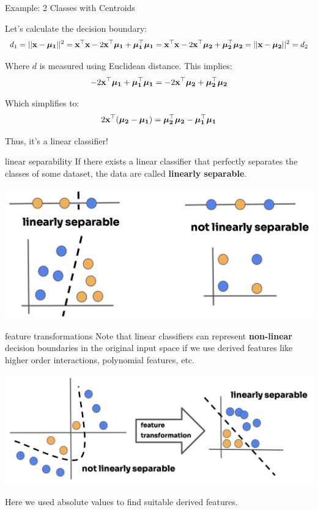 \documentclass[11pt,compress,t,notes=noshow, xcolor=table]{beamer}
\begin{document}
\begin{vbframe}{Example: 2 Classes with Centroids}

Let's calculate the decision boundary:
$$
d_1 = ||\xv - \muk[1]||^2 = \xv^\top \xv - 2 \xv^\top \muk[1] + \muk[1]^\top \muk[1]
= \xv^\top \xv - 2 \xv^\top \muk[2] + \muk[2]^\top \muk[2] = ||\xv - \muk[2]||^2 = d_2
$$

Where $d$ is measured using Euclidean distance. This implies:
$$
-2 \xv^\top \muk[1] + \muk[1]^\top \muk[1]
= -2 \xv^\top \muk[2] + \muk[2]^\top \muk[2]
$$

Which simplifies to:
$$
2 \xv^\top (\muk[2] - \muk[1]) =\muk[2]^\top \muk[2] - \muk[1]^\top \muk[1]
$$

Thus, it's a linear classifier!

\end{vbframe}


\begin{vbframe}{linear separability}
If there exists a linear classifier that perfectly separates the classes of some dataset, the data are called \textbf{linearly separable}.

\vspace{1cm}

\begin{center}
\includegraphics{figure_man/linear_separability-1.png} 
\end{center}

\end{vbframe}


\begin{vbframe}{feature transformations}
Note that linear classifiers can represent \textbf{non-linear} decision boundaries in the original input space if we use derived features like higher order interactions, polynomial features, etc.

\begin{center}
\includegraphics{figure_man/linear_separability-2.png} 
\end{center}

\lz

Here we used absolute values to find suitable derived features.

\end{vbframe}

\endlecture
\end{document}
